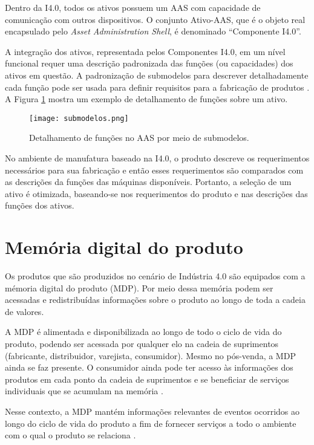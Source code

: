 	Dentro da I4.0, todos os ativos possuem um AAS com capacidade de comunicação com outros dispositivos. O conjunto Ativo-AAS, que é o objeto real encapsulado pelo \textit{Asset Administration Shell}, é denominado ``Componente I4.0''.
	
	A integração dos ativos, representada pelos Componentes I4.0, em um nível funcional requer uma descrição padronizada das funções (ou capacidades) dos ativos em questão. A padronização de submodelos para descrever detalhadamente cada função pode ser usada para definir requisitos para a fabricação de produtos \cite{bedenbender2017aasexamples}. A Figura \ref{fig:submodelos} mostra um exemplo de detalhamento de funções sobre um ativo.
	
	\begin{figure}[H]
		\centering
		\caption{Detalhamento de funções no AAS por meio de submodelos.}
		\texttt{[image: submodelos.png]}
		\label{fig:submodelos}
	\end{figure}

	No ambiente de manufatura baseado na I4.0, o produto descreve os requerimentos necessários para sua fabricação e então esses requerimentos são comparados com as descrições da funções das máquinas disponíveis. Portanto, a seleção de um ativo é otimizada, baseando-se nos requerimentos do produto e nas descrições das funções dos ativos.
	

\section{Memória digital do produto}

	Os produtos que são produzidos no cenário de Indústria 4.0 são equipados com a mémoria digital do produto (MDP). Por meio dessa memória podem ser acessadas e redistribuídas informações sobre o produto ao longo de toda a cadeia de valores.

	A MDP é alimentada e disponibilizada ao longo de todo o ciclo de vida do produto, podendo ser acessada por qualquer elo na cadeia de suprimentos (fabricante, distribuidor, varejista, consumidor). Mesmo no pós-venda, a MDP ainda se faz presente. O consumidor ainda pode ter acesso às informações dos produtos em cada ponto da cadeia de suprimentos e se beneficiar de serviços individuais que se acumulam na memória \cite{brandherm2011productmemory}.

	Nesse contexto, a MDP mantém informações relevantes de eventos ocorridos ao longo do ciclo de vida do produto a fim de fornecer serviços a todo o ambiente com o qual o produto se relaciona \cite{brandherm2011productmemory}.
	
